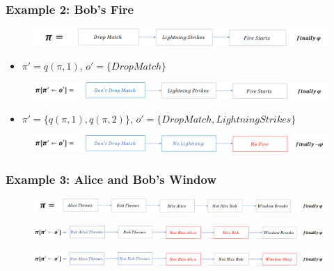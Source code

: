 \documentclass{beamer}
\theoremstyle{plain}
\theoremstyle{definition}
\begin{document}
\begin{frame}
\frametitle{Example 2: Bob's Fire}

\begin{figure}
\includegraphics[scale=.33]{bobPlanOriginal}
\end{figure}
\begin{itemize}
\item $\pi'= q(\pi,1)$, $o'=\{Drop Match\}$
\end{itemize}
\begin{figure}
\includegraphics[scale=.32]{bobPlanCounterfactual}
\end{figure}

\begin{itemize}
\item $\pi'= \{q(\pi,1),q(\pi,2)\}$, $o'=\{Drop Match, Lightning Strikes\}$
\end{itemize}

\begin{figure}
\includegraphics[scale=.32]{bobPlanCounterfactual2}
\end{figure}
\end{frame}


\begin{frame}
\frametitle{Example 3: Alice and Bob's Window}
\begin{figure}
\includegraphics[scale=.28]{alicebobPlanOriginal}
\end{figure}

\begin{figure}
\includegraphics[scale=.28]{alicebobPlanCounterfactual}
\end{figure}

\begin{figure}
\includegraphics[scale=.28]{alicebobPlanCounterfactual2}
\end{figure}
\end{frame}
\end{document}
